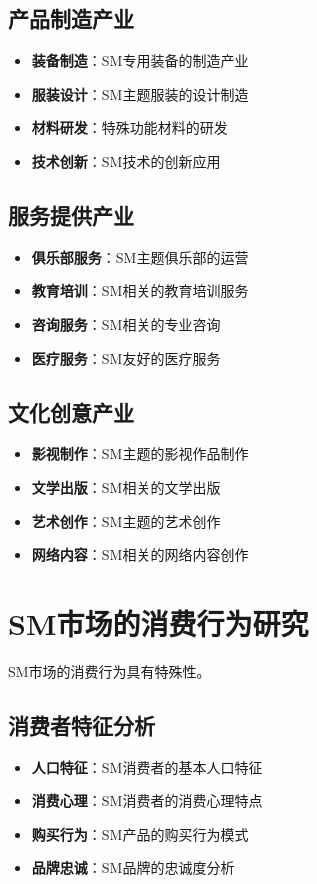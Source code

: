 \documentclass[12pt,UTF8]{ctexbook}
\begin{document}
\subsection{产品制造产业}
\begin{itemize}[leftmargin=2cm]
	\item \textbf{装备制造}：SM专用装备的制造产业
	\item \textbf{服装设计}：SM主题服装的设计制造
	\item \textbf{材料研发}：特殊功能材料的研发
	\item \textbf{技术创新}：SM技术的创新应用
\end{itemize}

\subsection{服务提供产业}
\begin{itemize}[leftmargin=2cm]
	\item \textbf{俱乐部服务}：SM主题俱乐部的运营
	\item \textbf{教育培训}：SM相关的教育培训服务
	\item \textbf{咨询服务}：SM相关的专业咨询
	\item \textbf{医疗服务}：SM友好的医疗服务
\end{itemize}

\subsection{文化创意产业}
\begin{itemize}[leftmargin=2cm]
	\item \textbf{影视制作}：SM主题的影视作品制作
	\item \textbf{文学出版}：SM相关的文学出版
	\item \textbf{艺术创作}：SM主题的艺术创作
	\item \textbf{网络内容}：SM相关的网络内容创作
\end{itemize}

\section{SM市场的消费行为研究}
SM市场的消费行为具有特殊性。

\subsection{消费者特征分析}
\begin{itemize}[leftmargin=2cm]
	\item \textbf{人口特征}：SM消费者的基本人口特征
	\item \textbf{消费心理}：SM消费者的消费心理特点
	\item \textbf{购买行为}：SM产品的购买行为模式
	\item \textbf{品牌忠诚}：SM品牌的忠诚度分析
\end{itemize}
\end{document}
